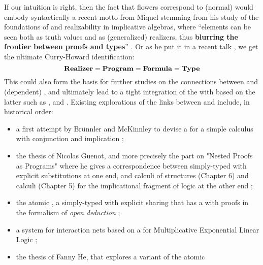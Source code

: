 \begin{scope}
If our intuition is right, then the fact that flowers correspond to (normal)
 would embody syntactically a recent motto from Miquel stemming
from his study of the foundations of  and realizability in
implicative
algebras, where ``elements can be seen both as truth values and as (generalized)
realizers, thus \textbf{blurring the frontier between proofs and
types}'' . Or as he put it in a
recent talk \cite{miquel_implicative_topos_2022}, we get the ultimate
Curry-Howard identification:
$$
\text{\textbf{Realizer}} = \text{\textbf{Program}} = \text{\textbf{Formula}} = \text{\textbf{Type}}
$$
This could also form the basis for further studies on the connections between
 and (dependent) , and ultimately lead to a tight
integration of the  with  based on the
latter such as ,  and . Existing explorations of the
links between  and  include, in historical
order:
\begin{itemize}
  \item a first attempt by Brünnler and McKinnley to devise a  for a simple   calculus with
  conjunction and implication ;
  \item the thesis of Nicolas Guenot, and more precisely the part on "Nested
  Proofs as Programs" where he gives a correspondence between simply-typed
   with explicit substitutions at one end, and calculi of
  structures (Chapter 6) and  calculi (Chapter 5) for the
  implicational fragment of  logic at the other end
  \cite{guenot_nested_2013};
  \item the atomic , a simply-typed  with
  explicit sharing that has a  with proofs in the
  formalism of \emph{open deduction} ;
  \item a  system for interaction nets based on a  for
  Multiplicative Exponential Linear Logic ;
  \item the thesis of Fanny He, that explores a  variant of the atomic

\end{itemize}
\end{scope}

